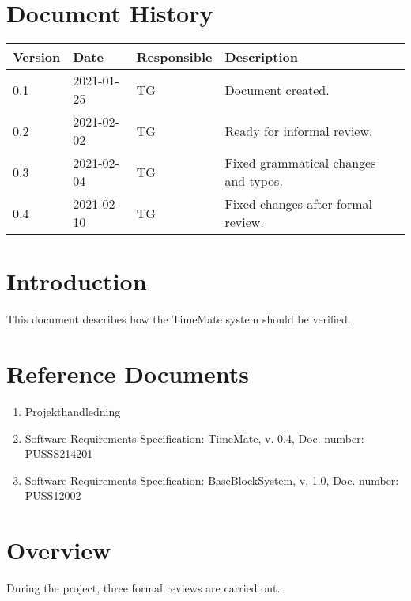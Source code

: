 \documentclass{article}
\date {#1}
\title {
    \documentNumber {02}    
    
    \documentVersion {0.4}
    
    \documentTitle {Software Verification and Validation Specification}
    \documentGroup {2}
    
    \documentResponsible {Test Group}
    \documentAuthors {Test Group}
    
    \documentDate {2021-02-10}
}
\begin{document}
\maketitle
\thispagestyle{empty}

\newpage

\tableofcontents

\newpage



\section{Document History}
\begin{tabular}{ l | l | l | l }
    Version & Date & Responsible & Description \\
    \hline
    0.1 & 2021-01-25 & TG & Document created. \\
    0.2 & 2021-02-02 & TG & Ready for informal review. \\
    0.3 & 2021-02-04 & TG & Fixed grammatical changes and typos. \\
    0.4 & 2021-02-10 & TG & Fixed changes after formal review. \\
\end{tabular}

\section{Introduction}

	This document describes how the TimeMate system should be verified. 

\section{Reference Documents}

\begin{enumerate}
  \item Projekthandledning 
  \item Software Requirements Specification: TimeMate, v. 0.4, Doc. number: PUSSS214201
  \item Software Requirements Specification: BaseBlockSystem, v. 1.0, Doc. number: PUSS12002

\end{enumerate}

\section{Overview}
During the project, three formal reviews are carried out.
\end{document}
